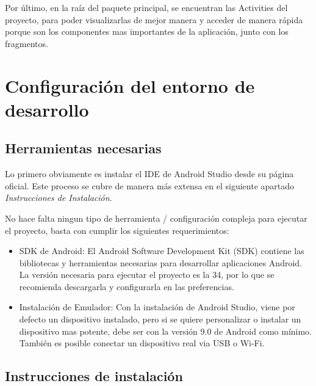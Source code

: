 \documentclass{article}
\begin{document}
Por último, en la raíz del paquete principal, se encuentran las Activities del proyecto, para poder visualizarlas de mejor manera y acceder de manera rápida porque son los componentes mas importantes de la aplicación, junto con los fragmentos.

\section{Configuración del entorno de desarrollo}

    \subsection{Herramientas necesarias}

    Lo primero obviamente es instalar el IDE de Android Studio desde su página oficial. Este proceso se cubre de manera más extensa en el siguiente apartado \textit{Instrucciones de Instalación}.

    No hace falta ningun tipo de herramienta / configuración compleja para ejecutar el proyecto, basta con cumplir los siguientes requerimientos:

    \begin{itemize}
        \item SDK de Android: El Android Software Development Kit (SDK) contiene las bibliotecas y herramientas necesarias para desarrollar aplicaciones Android. La versión necesaria para ejecutar el proyecto es la 34, por lo que se recomienda descargarla  y configurarla en las preferencias.
        \item Instalación de Emulador: Con la instalación de Android Studio, viene por defecto un dispositivo instalado, pero si se quiere personalizar o instalar un dispositivo mas potente, debe ser con la versión 9.0 de Android como mínimo. También es posible conectar un dispositivo real via USB o Wi-Fi.
    \end{itemize}

    \subsection{Instrucciones de instalación}
\end{document}
